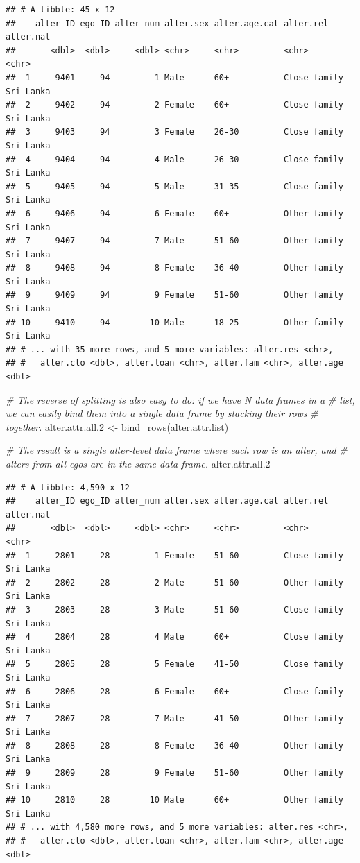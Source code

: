 \documentclass[
]{book}
\newenvironment{Shaded}{\begin{snugshade}}{\end{snugshade}}
\newcommand{\CommentTok}[1]{\textcolor[rgb]{0.56,0.35,0.01}{\textit{#1}}}
\newcommand{\FloatTok}[1]{\textcolor[rgb]{0.00,0.00,0.81}{#1}}
\newcommand{\FunctionTok}[1]{\textcolor[rgb]{0.00,0.00,0.00}{#1}}
\newcommand{\NormalTok}[1]{#1}
\newcommand{\OtherTok}[1]{\textcolor[rgb]{0.56,0.35,0.01}{#1}}
\begin{document}
\begin{verbatim}
## # A tibble: 45 x 12
##    alter_ID ego_ID alter_num alter.sex alter.age.cat alter.rel    alter.nat
##       <dbl>  <dbl>     <dbl> <chr>     <chr>         <chr>        <chr>    
##  1     9401     94         1 Male      60+           Close family Sri Lanka
##  2     9402     94         2 Female    60+           Close family Sri Lanka
##  3     9403     94         3 Female    26-30         Close family Sri Lanka
##  4     9404     94         4 Male      26-30         Close family Sri Lanka
##  5     9405     94         5 Male      31-35         Close family Sri Lanka
##  6     9406     94         6 Female    60+           Other family Sri Lanka
##  7     9407     94         7 Male      51-60         Other family Sri Lanka
##  8     9408     94         8 Female    36-40         Other family Sri Lanka
##  9     9409     94         9 Female    51-60         Other family Sri Lanka
## 10     9410     94        10 Male      18-25         Other family Sri Lanka
## # ... with 35 more rows, and 5 more variables: alter.res <chr>,
## #   alter.clo <dbl>, alter.loan <chr>, alter.fam <chr>, alter.age <dbl>
\end{verbatim}

\begin{Shaded}
\begin{Highlighting}[]
\CommentTok{\# The reverse of splitting is also easy to do: if we have N data frames in a}
\CommentTok{\# list, we can easily bind them into a single data frame by stacking their rows}
\CommentTok{\# together.}
\NormalTok{alter.attr.all}\FloatTok{.2} \OtherTok{\textless{}{-}} \FunctionTok{bind\_rows}\NormalTok{(alter.attr.list)}

\CommentTok{\# The result is a single alter{-}level data frame where each row is an alter, and}
\CommentTok{\# alters from all egos are in the same data frame.}
\NormalTok{alter.attr.all}\FloatTok{.2}
\end{Highlighting}
\end{Shaded}

\begin{verbatim}
## # A tibble: 4,590 x 12
##    alter_ID ego_ID alter_num alter.sex alter.age.cat alter.rel    alter.nat
##       <dbl>  <dbl>     <dbl> <chr>     <chr>         <chr>        <chr>    
##  1     2801     28         1 Female    51-60         Close family Sri Lanka
##  2     2802     28         2 Male      51-60         Other family Sri Lanka
##  3     2803     28         3 Male      51-60         Close family Sri Lanka
##  4     2804     28         4 Male      60+           Close family Sri Lanka
##  5     2805     28         5 Female    41-50         Close family Sri Lanka
##  6     2806     28         6 Female    60+           Close family Sri Lanka
##  7     2807     28         7 Male      41-50         Other family Sri Lanka
##  8     2808     28         8 Female    36-40         Other family Sri Lanka
##  9     2809     28         9 Female    51-60         Other family Sri Lanka
## 10     2810     28        10 Male      60+           Other family Sri Lanka
## # ... with 4,580 more rows, and 5 more variables: alter.res <chr>,
## #   alter.clo <dbl>, alter.loan <chr>, alter.fam <chr>, alter.age <dbl>
\end{verbatim}
\end{document}
